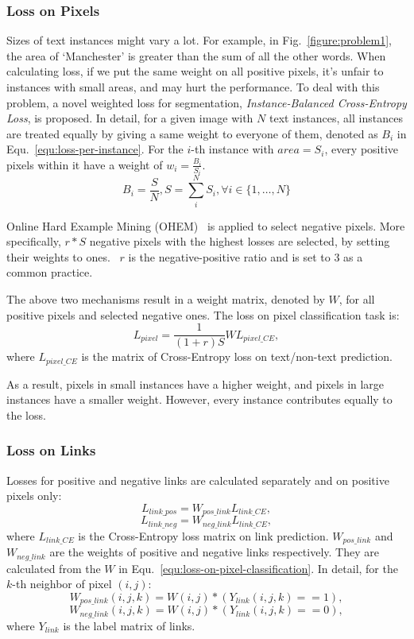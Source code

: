 \documentclass[letterpaper]{article} \usepackage{aaai18}  \usepackage{times}  \usepackage{helvet}  \usepackage{courier}  \usepackage{url}  \usepackage{graphicx}
\begin{document}
	\subsubsection{Loss on Pixels}
	Sizes of text instances might vary a lot. For example, in Fig.~\ref{figure:problem1}, the area of `Manchester' is greater than the sum of all the other words. When calculating loss, if we put the same weight on all positive pixels, it's unfair to instances with small areas, and may hurt the performance. To deal with this problem, a novel weighted loss for segmentation, \emph{Instance-Balanced Cross-Entropy Loss}, is proposed.
	In detail, for a given image with $N$ text instances, all instances are treated equally by giving a same weight to everyone of them, denoted as $B_i$ in Equ.~\ref{equ:loss-per-instance}. For the $i$-th instance with $area=S_i$, every positive pixels within it have a weight of $  w_i = \frac{B_i}{S_i}$.
	\begin{equation}
	B_i = \frac {S}{N}, S = \sum_i^N S_i, \forall i \in \{1, \dots, N\} \label{equ:loss-per-instance}
	\end{equation}
	
	
	Online Hard Example Mining (OHEM)~\cite{Shrivastava2016OHEM} is applied to select negative pixels. More specifically, $r*S$ negative pixels with the highest losses are selected, by setting their weights to ones. ~$r$ is the negative-positive ratio and is set to 3 as a common practice.
	
	The above two mechanisms result in a weight matrix, denoted by $W$, for all positive pixels and selected negative ones. The loss on pixel classification task is:
	\begin{equation}
	L_{pixel} = \frac{1}{(1 + r)S} W L_{pixel\_CE}
	\label{equ:loss-on-pixel-classification},
	\end{equation}
	where $L_{pixel\_CE}$ is the matrix of Cross-Entropy loss on text/non-text prediction.
	
	As a result, pixels in small instances have a higher weight, and pixels in large instances have a smaller weight. However, every instance contributes equally to the loss.
	
	\subsubsection{Loss on Links}
	Losses for positive and negative links are calculated separately and on positive pixels only:
	$$
	L_{link\_pos} = W_{pos\_link} L_{link\_CE},
	$$
	$$
	L_{link\_neg}= W_{neg\_link} L_{link\_CE},
	$$
	where $L_{link\_CE}$ is the Cross-Entropy loss matrix on link prediction.  $W_{pos\_link}$ and $W_{neg\_link}$ are the weights of positive and negative links respectively. They are calculated from the $W$ in Equ.~\ref{equ:loss-on-pixel-classification}.
	In detail, for the $k$-th neighbor of pixel $(i, j)$:
	$$
	W_{pos\_link}(i,j,k) = W(i, j) * (Y_{link}(i,j,k) == 1), 
	$$
	$$
	W_{neg\_link}(i,j,k) = W(i, j) * (Y_{link}(i,j,k) == 0), 
	$$
	where $Y_{link}$ is the label matrix of links.\\
	
\end{document}
